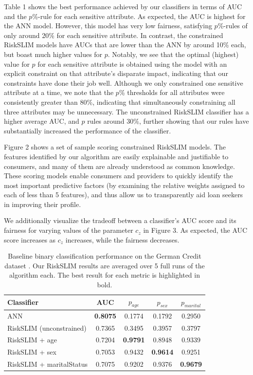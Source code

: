 \documentclass[11pt, margin=1in]{article}
\begin{document}
Table 1 shows the best performance achieved by our classifiers in terms of AUC and the $p$\%-rule for each sensitive attribute. As expected, the AUC is highest for the ANN model. However, this model has very low fairness, satisfying $p$\%-rules of only around 20\% for each sensitive attribute. In contrast, the constrained RiskSLIM models have AUCs that are lower than the ANN by around 10\% each, but boast much higher values for $p$. Notably, we see that the optimal (highest) value for $p$ for each sensitive attribute is obtained using the model with an explicit constraint on that attribute's disparate impact, indicating that our constraints have done their job well. Although we only constrained one sensitive attribute at a time, we note that the $p$\% thresholds for all attributes were consistently greater than 80\%, indicating that simultaneously constraining all three attributes may be unnecessary. The unconstrained RiskSLIM classifier has a higher average AUC, and $p$ rules around 30\%, further showing that our rules have substantially increased the performance of the classifier.

Figure 2 shows a set of sample scoring constrained RiskSLIM models. The features identified by our algorithm are easily explainable and justifiable to consumers, and many of them are already understood as common knowledge. These scoring models enable consumers and providers to quickly identify the most important predictive factors (by examining the relative weights assigned to each of less than 5 features), and thus allow us to transparently aid loan seekers in improving their profile.

We additionally visualize the tradeoff between a classifier's AUC score and its fairness for varying values of the parameter $c_z$ in Figure 3. As expected, the AUC score increases as $c_z$ increases, while the fairness decreases.

\begin{table} \label{table:baselines}
	\centering
	\begin{tabular}{lcccc}
		\toprule
		Classifier & AUC & $p_{age}$ & $p_{sex}$ & $p_{marital}$\\
		\midrule
		ANN & \textbf{0.8075} & 0.1774 & 0.1792 & 0.2950 \\
		RiskSLIM (unconstrained) & 0.7365 & 0.3495 & 0.3957 & 0.3797 \\
		RiskSLIM + age & 0.7204 & \textbf{0.9791} & 0.8948 & 0.9339 \\
		RiskSLIM + sex & 0.7053 & 0.9432 & \textbf{0.9614} & 0.9251 \\
		RiskSLIM + maritalStatus & 0.7075 & 0.9202 & 0.9376 & \textbf{0.9679} \\
		\bottomrule
	\end{tabular}
	\caption{Baseline binary classification performance on the German Credit dataset \cite{data}. Our RiskSLIM results are averaged over 5 full runs of the algorithm each. The best result for each metric is highlighted in bold.}
	\label{fig:baselines}
\end{table}
\end{document}
